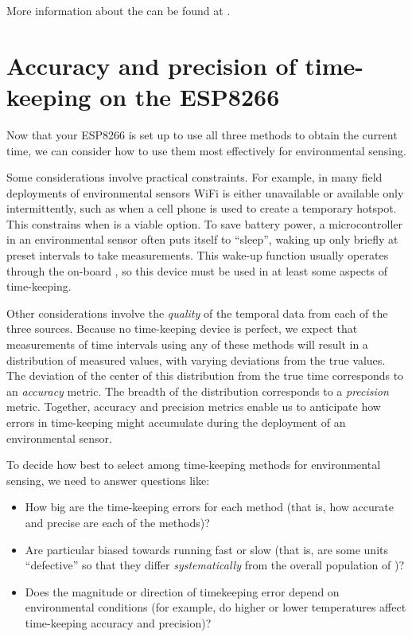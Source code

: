More information about the  \rtc can be found at .



\section{Accuracy and precision of time-keeping on the ESP8266}
Now that your ESP8266 is set up to use all three methods to obtain the current time, we can consider how to use them most effectively for environmental sensing. 

Some considerations involve practical constraints. 
For example, in many field deployments of environmental sensors WiFi is either unavailable or available only intermittently, such as when a cell phone is used to create a temporary hotspot.
This constrains when \ntp is a viable option.
To save battery power, a microcontroller in an environmental sensor often puts itself to ``sleep'', waking up only briefly at preset intervals to take measurements.  
This wake-up function usually operates through the on-board \rtc, so this device must be used in at least some aspects of time-keeping. 

Other considerations involve the \emph{quality} of the temporal data from each of the three sources. %
Because no time-keeping device is perfect, we expect that measurements of time intervals using any of these methods will result in a distribution of measured values, with varying deviations from the true values. 
The deviation of the center of this distribution from the true time corresponds to an \emph{accuracy} metric. 
The breadth of the distribution corresponds to a \emph{precision} metric. 
Together, accuracy and precision metrics enable us to anticipate how errors in time-keeping might accumulate during the deployment of an environmental sensor.

To decide how best to select among time-keeping methods for environmental sensing, we need to answer questions like: 
\begin{itemize}
	\item How big are the time-keeping errors for each method (that is, how accurate and precise are each of the methods)?
	\item Are particular \rtcs biased towards running fast or slow (that is, are some units ``defective'' so that they differ \emph{systematically} from the overall population of \rtcs)?
	\item Does the magnitude or direction of timekeeping error depend on environmental conditions (for example, do higher or lower temperatures affect time-keeping accuracy and precision)?  
\end{itemize}

